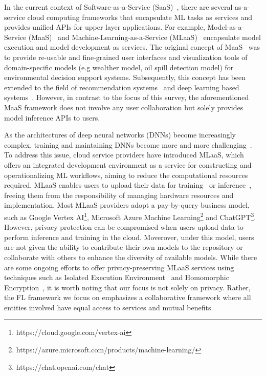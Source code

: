 In the current context of Software-as-a-Service (SaaS)~\cite{brereton1999future}, there are several as-a-service cloud computing frameworks that encapsulate ML tasks as services and provides unified APIs for upper layer applications. 
For example, Model-as-a-Service (MaaS)~\cite{geller2007model, roman2009model, zou2012maas, liu2021jizhi, sun2022black} and Machine-Learning-as-a-Service (MLaaS)~\cite{ribeiro2015mlaas, hanzlik2021mlcapsule, hesamifard2018privacy,li2017scaling, kourtellis2020flaas} encapsulate model execution and model development as services.
The original concept of MaaS~\cite{geller2007model, roman2009model} was to provide re-usable and fine-grained user interfaces and visualization tools of domain-specific models (e.g wealther model, oil spill detection model) for environmental decision support systems.
Subsequently, this concept has been extended to the field of recommendation systems~\cite{zou2012maas} and deep learning based systems~\cite{liu2021jizhi, sun2022black}.
However, in contrast to the focus of this survey, the aforementioned MaaS framework does not involve any user collaboration but solely provides model inference APIs to users.

As the architectures of deep neural networks (DNNs) become increasingly complex, training and maintaining DNNs become more and more challenging~\cite{han2021pre}. To address this issue, cloud service providers have introduced MLaaS, which offers an integrated development environment as a service for constructing and operationalizing ML workflows, aiming to reduce the computational resources required.
MLaaS enables users to upload their data for training~\cite{ribeiro2015mlaas, zhao2021veriml, hesamifard2018privacy} or inference~\cite{hanzlik2021mlcapsule}, freeing them from the responsibility of managing hardware resources and implementation.
Most MLaaS providers adopt a pay-by-query business model, such as Google Vertex AI\footnote{https://cloud.google.com/vertex-ai}, Microsoft Azure Machine Learning\footnote{https://azure.microsoft.com/products/machine-learning/} and ChatGPT\footnote{https://chat.openai.com/chat}.
However, privacy protection can be compromised when users upload data to perform inference and training in the cloud.
Moverover, under this model, users are not given the ability to contribute their own models to the repository or collaborate with others to enhance the diversity of available models. 
While there are some ongoing efforts to offer privacy-preserving MLaaS services using techniques such as Isolated Execution Environment~\cite{hanzlik2021mlcapsule, mckeen2016intel} and Homomorphic Encryption~\cite{hesamifard2018privacy,gentry2009fully}, it is worth noting that our focus is not solely on privacy.
Rather, the FL framework we focus on emphasizes a collaborative framework where all entities involved have equal access to services and mutual benefits.

